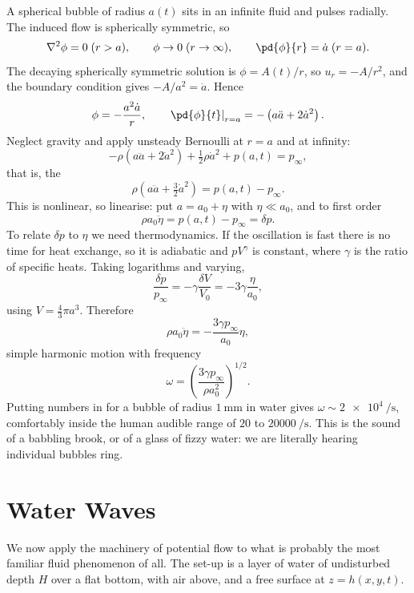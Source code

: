 \begin{example}
	A spherical bubble of radius $a(t)$ sits in an infinite fluid and pulses radially. The induced flow is spherically symmetric, so
	$$
	\nabla^2 \phi = 0 \; (r > a), \qquad \phi \to 0 \;(r\to\infty), \qquad \pd{\phi}{r} = \dot a \; (r = a).
	$$
	The decaying spherically symmetric solution is $\phi = A(t)/r$, so $u_r = -A/r^2$, and the boundary condition gives $-A/a^2 = \dot a$. Hence
	$$
	\phi = -\frac{a^2 \dot a}{r}, \qquad \left.\pd{\phi}{t}\right|_{r=a} = -\left(a\ddot a + 2\dot a^2\right).
	$$
	Neglect gravity and apply unsteady Bernoulli at $r = a$ and at infinity:
	$$
	-\rho\left(a \ddot a + 2\dot a^2\right) + \tfrac{1}{2}\rho \dot a^2 + p(a, t) = p_\infty,
	$$
	that is, the 
	$$
	\rho\left(a\ddot a + \tfrac{3}{2}\dot a^2\right) = p(a,t) - p_\infty.
	$$
	This is nonlinear, so linearise: put $a = a_0 + \eta$ with $\eta \ll a_0$, and to first order
	$$
	\rho a_0 \ddot \eta = p(a, t) - p_\infty = \delta p.
	$$
	To relate $\delta p$ to $\eta$ we need thermodynamics. If the oscillation is fast there is no time for heat exchange, so it is adiabatic and $pV^\gamma$ is constant, where $\gamma$ is the ratio of specific heats. Taking logarithms and varying,
	$$
	\frac{\delta p}{p_\infty} = -\gamma\frac{\delta V}{V_0} = -3\gamma\frac{\eta}{a_0},
	$$
	using $V = \tfrac43 \pi a^3$. Therefore
	$$
	\rho a_0 \ddot \eta = -\frac{3\gamma p_\infty}{a_0}\eta,
	$$
	simple harmonic motion with frequency
	$$
	\omega = \left(\frac{3\gamma p_\infty}{\rho a_0^2}\right)^{1/2}.
	$$
	Putting numbers in for a bubble of radius $\SI{1}{\milli\meter}$ in water gives $\omega \sim \SI{2e4}{\per\second}$, comfortably inside the human audible range of $20$ to $\SI{20000}{\per\second}$. This is the sound of a babbling brook, or of a glass of fizzy water: we are literally hearing individual bubbles ring.
\end{example}

\section{Water Waves}

We now apply the machinery of potential flow to what is probably the most familiar fluid phenomenon of all. The set-up is a layer of water of undisturbed depth $H$ over a flat bottom, with air above, and a free surface at $z = h(x, y, t)$.

